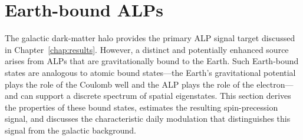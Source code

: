 
\section{Earth-bound ALPs}\label{sec:theory:earthALP}













The galactic dark-matter halo provides the primary ALP signal target discussed in Chapter~\ref{chap:results}. However, a distinct and potentially enhanced source arises from ALPs that are gravitationally bound to the Earth. Such Earth-bound states are analogous to atomic bound states---the Earth's gravitational potential plays the role of the Coulomb well and the ALP plays the role of the electron---and can support a discrete spectrum of spatial eigenstates. This section derives the properties of these bound states, estimates the resulting spin-precession signal, and discusses the characteristic daily modulation that distinguishes this signal from the galactic background.

